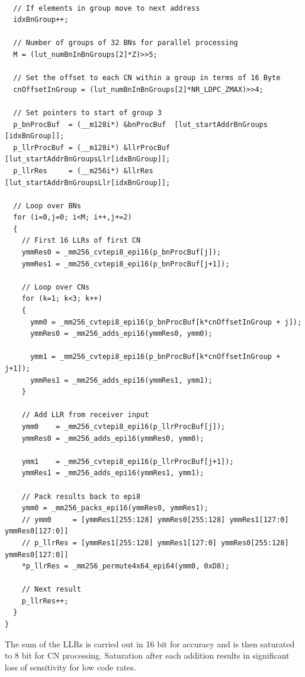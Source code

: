 \documentclass{article}
\begin{document}
\begin{lstlisting}[frame=single,caption={Example of BN processing for group 3 from \texttt{bnProcPc}.},label=code_bnproc]  % Start your code-block

  // If elements in group move to next address
  idxBnGroup++;

  // Number of groups of 32 BNs for parallel processing
  M = (lut_numBnInBnGroups[2]*Z)>>5;

  // Set the offset to each CN within a group in terms of 16 Byte
  cnOffsetInGroup = (lut_numBnInBnGroups[2]*NR_LDPC_ZMAX)>>4;

  // Set pointers to start of group 3
  p_bnProcBuf  = (__m128i*) &bnProcBuf  [lut_startAddrBnGroups   [idxBnGroup]];
  p_llrProcBuf = (__m128i*) &llrProcBuf [lut_startAddrBnGroupsLlr[idxBnGroup]];
  p_llrRes     = (__m256i*) &llrRes     [lut_startAddrBnGroupsLlr[idxBnGroup]];

  // Loop over BNs
  for (i=0,j=0; i<M; i++,j+=2)
  {
    // First 16 LLRs of first CN
    ymmRes0 = _mm256_cvtepi8_epi16(p_bnProcBuf[j]);
    ymmRes1 = _mm256_cvtepi8_epi16(p_bnProcBuf[j+1]);

    // Loop over CNs
    for (k=1; k<3; k++)
    {
      ymm0 = _mm256_cvtepi8_epi16(p_bnProcBuf[k*cnOffsetInGroup + j]);
      ymmRes0 = _mm256_adds_epi16(ymmRes0, ymm0);

      ymm1 = _mm256_cvtepi8_epi16(p_bnProcBuf[k*cnOffsetInGroup + j+1]);
      ymmRes1 = _mm256_adds_epi16(ymmRes1, ymm1);
    }

    // Add LLR from receiver input
    ymm0    = _mm256_cvtepi8_epi16(p_llrProcBuf[j]);
    ymmRes0 = _mm256_adds_epi16(ymmRes0, ymm0);

    ymm1    = _mm256_cvtepi8_epi16(p_llrProcBuf[j+1]);
    ymmRes1 = _mm256_adds_epi16(ymmRes1, ymm1);

    // Pack results back to epi8
    ymm0 = _mm256_packs_epi16(ymmRes0, ymmRes1);
    // ymm0     = [ymmRes1[255:128] ymmRes0[255:128] ymmRes1[127:0] ymmRes0[127:0]]
    // p_llrRes = [ymmRes1[255:128] ymmRes1[127:0] ymmRes0[255:128] ymmRes0[127:0]]
    *p_llrRes = _mm256_permute4x64_epi64(ymm0, 0xD8);

    // Next result
    p_llrRes++;
  }
}

\end{lstlisting}

The sum of the LLRs is carried out in 16 bit for accuracy and is then saturated to 8 bit for CN processing. Saturation after each addition results in significant loss of sensitivity for low code rates.
\end{document}
